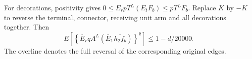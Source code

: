 For decorations, positivity gives
\(0\le\allowbreak  E_rpT^L(E_tF_b)\le\allowbreak  pT^LF_b\).
Replace \(K\) by \(-K\) to reverse the terminal, connector, receiving unit arm and all decorations together. Then
\[
E\left[\left\{\overline E_rqA^L(\overline E_t\,\overline{h_2f_b})\right\}^8\right]
\le1-d/20000.
\]
The overline denotes the full reversal of the corresponding original edges.
